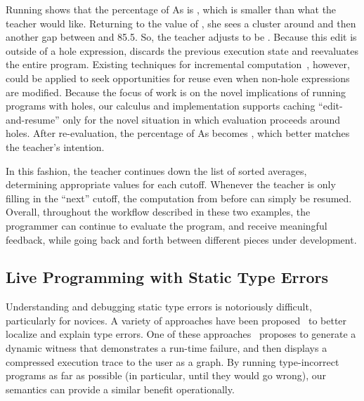 \noindent
%
Running  shows that the percentage of As is
, which is smaller than what the teacher would like.
%
Returning to the value of , she sees a cluster around 
and then another gap between  and {85.5}.
%
So, the teacher adjusts  to be .
%
Because this edit is outside of a hole expression, \HazelnutLive{} discards the
previous execution state and reevaluates the entire program.
%
Existing techniques for incremental computation~\cite{XXX,XXX}, however, could
be applied to seek opportunities for reuse even when non-hole expressions are
modified.
%
Because the focus of work is on the novel implications of running programs with
holes, our calculus and implementation supports caching ``edit-and-resume'' only
for the novel situation in which evaluation proceeds around holes.
%
After re-evaluation, the percentage of As becomes , which better
matches the teacher's intention.

In this fashion, the teacher continues down the list of sorted averages,
determining appropriate values for each cutoff.
%
Whenever the teacher is only filling in the ``next'' cutoff, the computation
from before can simply be resumed.
%
Overall, throughout the workflow described in these two examples, the programmer
can continue to evaluate the program, and receive meaningful feedback, while
going back and forth between different pieces under development.



\subsection{Live Programming with Static Type Errors}

Understanding and debugging static type errors is notoriously difficult,
particularly for novices.
%
A variety of approaches have been
proposed~\cite{Seminal,ChenErwig2014,Pavlinovic2015,sherrloc} to better localize
and explain type errors.
%
One of these approaches~\cite{Seidel2016} proposes to generate a dynamic witness
that demonstrates a run-time failure, and then displays a compressed execution
trace to the user as a graph.
%
By running type-incorrect programs as far as possible (in particular, until they
would go wrong), our semantics can provide a similar benefit operationally.
%

